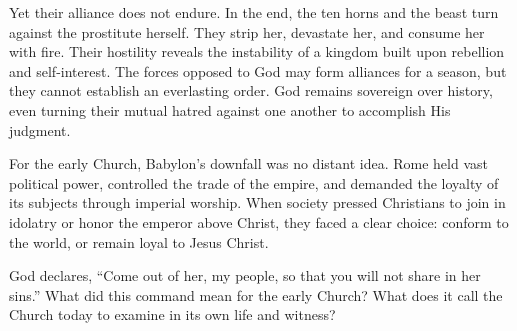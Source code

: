 Yet their alliance does not endure. In the end, the ten horns and the beast turn against the prostitute herself. They strip her, devastate her, and consume her with fire. Their hostility reveals the instability of a kingdom built upon rebellion and self-interest. The forces opposed to God may form alliances for a season, but they cannot establish an everlasting order. God remains sovereign over history, even turning their mutual hatred against one another to accomplish His judgment.

For the early Church, Babylon's downfall was no distant idea. Rome held vast political power, controlled the trade of the empire, and demanded the loyalty of its subjects through imperial worship. When society pressed Christians to join in idolatry or honor the emperor above Christ, they faced a clear choice: conform to the world, or remain loyal to Jesus Christ.


\begin{ReaderQuestion}
God declares, “Come out of her, my people, so that you will not share in her sins.” What did this command mean for the early Church? What does it call the Church today to examine in its own life and witness?
\end{ReaderQuestion}

